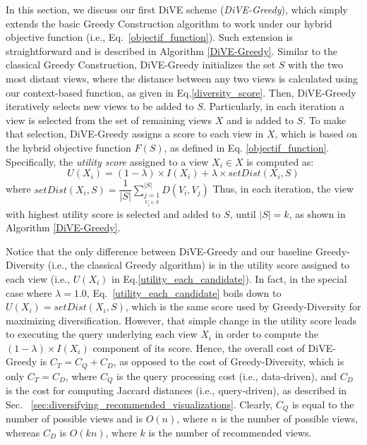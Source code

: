 In this section, we discuss our first DiVE scheme ({\em DiVE-Greedy}), which simply extends the basic Greedy Construction algorithm to work under our hybrid objective function (i.e., Eq.~\ref{objectif_function}). 
%
Such extension is straightforward  and is described in Algorithm \ref{DiVE-Greedy}. %
%
Similar to the classical Greedy Construction, DiVE-Greedy initializes the set $S$ with the two most distant views,  where the distance between any two views is calculated using our context-based function, as given in Eq.\ref{diversity_score}.
%
Then, DiVE-Greedy iteratively selects new views to be added to $S$. 
%
Particularly, in each iteration a view is selected from the set of remaining views $X$ and is added to $S$.
%
To make that selection, DiVE-Greedy assigns a score to each view in $X$, which is based on the hybrid objective function $F\left(S\right)$, as defined in Eq. \ref{objectif_function}. 
%
Specifically, the {\em utility score} assigned to a view $X_i \in X$ is computed as: 
\begin{equation}
	U\left(X_i\right)= \left(1-\lambda\right) \times I\left(X_i\right) + \lambda \times setDist\left(X_i, S\right)
	\label{utility_each_candidate}
\end{equation}
\noindent where $setDist\left(X_i, S\right) = \dfrac{1}{|S|} \sum_{\underset{V_j \in S}{j=1}}^{|S|} D\left(V_i, V_j\right) $
Thus, in each iteration, the view with highest utility score is selected and added to $S$, until $|S|=k$, as shown in Algorithm \ref{DiVE-Greedy}.  

%
Notice that the only difference between DiVE-Greedy and our baseline Greedy-Diversity (i.e., the classical Greedy algorithm) is in the utility score assigned to each view (i.e., $U(X_i)$ in Eq.\ref{utility_each_candidate}). 
%
In fact, in the special case where $\lambda=1.0$, Eq.~\ref{utility_each_candidate} boils down to $U\left(X_i\right)= setDist\left(X_i, S\right)$, which is the same score used by Greedy-Diversity for maximizing diversification. 
%
However, that simple change in the utility score leads to executing the query underlying each view $X_i$ in order to compute the $\left(1-\lambda\right) \times I\left(X_i\right)$ component of its score. 
%
Hence, the overall cost of DiVE-Greedy is $C_T=C_Q+C_D$, as opposed to the cost of Greedy-Diversity, which is only $C_T=C_D$, where $C_Q$ is the query processing cost (i.e., data-driven), and $C_D$ is the cost for computing Jaccard distances (i.e., query-driven), as described in Sec. ~\ref{sec:diversifying_recommended_visualizations}. Clearly, $C_Q$ is equal to the number of possible views and is $O(n)$, where $n$ is the number of possible views, whereas $C_D$ is $O(kn)$, where $k$ is the number of recommended views.
%

